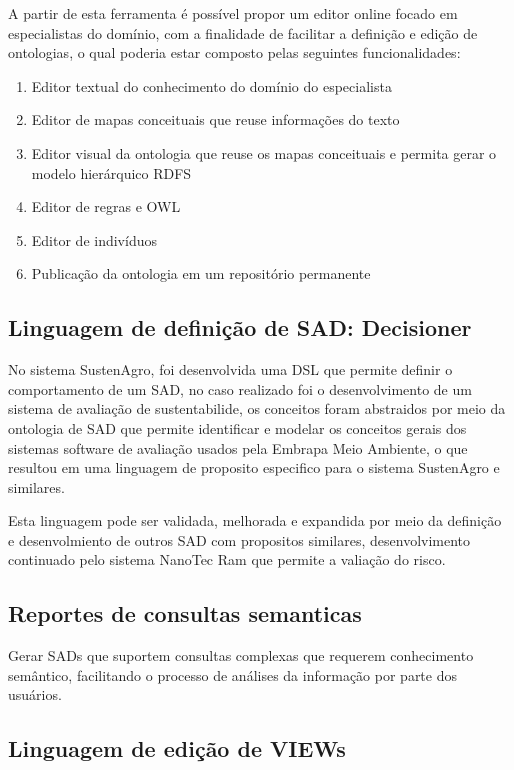 A partir de esta ferramenta é possível propor um editor online focado
em especialistas do domínio, com a finalidade de facilitar a definição
e edição de ontologias, o qual poderia estar composto pelas seguintes
funcionalidades:
\begin{enumerate}
\item Editor textual do conhecimento do domínio do especialista
\item Editor de mapas conceituais que reuse informações do texto
\item Editor visual da ontologia que reuse os mapas conceituais e permita
gerar o modelo hierárquico RDFS
\item Editor de regras e OWL
\item Editor de indivíduos
\item Publicação da ontologia em um repositório permanente
\end{enumerate}

\subsection{Linguagem de definição de SAD: Decisioner}

No sistema SustenAgro, foi desenvolvida uma DSL que permite definir
o comportamento de um SAD, no caso realizado foi o desenvolvimento
de um sistema de avaliação de sustentabilide, os conceitos foram abstraidos
por meio da ontologia de SAD que permite identificar e modelar os
conceitos gerais dos sistemas software de avaliação usados pela Embrapa
Meio Ambiente, o que resultou em uma linguagem de proposito especifico
para o sistema SustenAgro e similares.

Esta linguagem pode ser validada, melhorada e expandida por meio da
definição e desenvolmiento de outros SAD com propositos similares,
desenvolvimento continuado pelo sistema NanoTec Ram que permite a
valiação do risco.

\subsection{Reportes de consultas semanticas}

Gerar SADs que suportem consultas complexas que requerem conhecimento
semântico, facilitando o processo de análises da informação por parte
dos usuários.

\subsection{Linguagem de edição de VIEWs}

